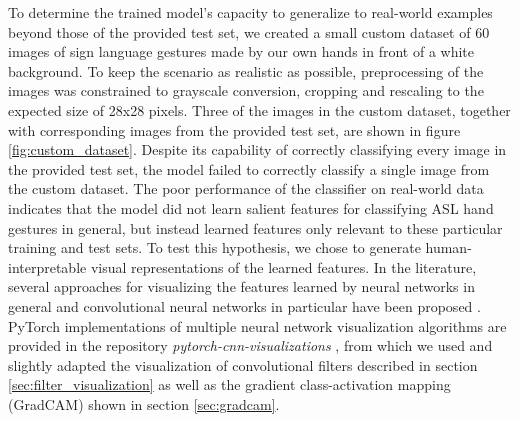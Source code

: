 \documentclass[a4paper]{article}
\begin{document}
To determine the trained model's capacity to generalize to real-world examples beyond those of the provided test set, we created a small custom dataset of 60 images of sign language gestures made by our own hands in front of a white background. To keep the scenario as realistic as possible, preprocessing of the images was constrained to grayscale conversion, cropping and rescaling to the expected size of 28x28 pixels. Three of the images in the custom dataset, together with corresponding images from the provided test set, are shown in figure \ref{fig:custom_dataset}. Despite its capability of correctly classifying every image in the provided test set, the model failed to correctly classify a single image from the custom dataset. The poor performance of the classifier on real-world data indicates that the model did not learn salient features for classifying ASL hand gestures in general, but instead learned features only relevant to these particular training and test sets. To test this hypothesis, we chose to generate human-interpretable visual representations of the learned features. In the literature, several approaches for visualizing the features learned by neural networks in general and convolutional neural networks in particular have been proposed \cite{Qin2018}. PyTorch implementations of multiple neural network visualization algorithms are provided in the repository \textit{pytorch-cnn-visualizations} \cite{Ozbulak2018}, from which we used and slightly adapted the visualization of convolutional filters described in section \ref{sec:filter_visualization} as well as the gradient class-activation mapping (GradCAM) shown in section \ref{sec:gradcam}.
\end{document}
